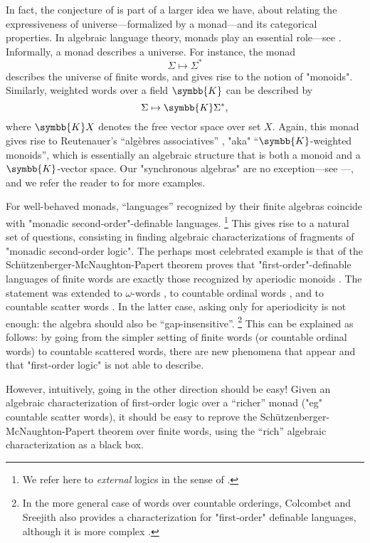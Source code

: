 In fact, the conjecture of 
is part of a larger idea we have, about relating the expressiveness of
universe---formalized by a monad---and its categorical properties. 
In algebraic language theory, monads play an essential role---see .
Informally, a monad describes a universe.
For instance, the monad
\[
	\Sigma \mapsto \Sigma^*
\]
describes the universe of finite words, and gives rise to the notion of
"monoids". Similarly, weighted words over a field $\symbb{K}$ can be described by
\[
	\Sigma \mapsto \symbb{K}\Sigma^*,
\]
where $\symbb{K}X$ denotes the free vector space over set $X$.
Again, this monad gives rise to Reutenauer's ``algèbres associatives''
\cite{Reutenauer1980SeriesFormelles}, "aka" ``$\symbb{K}$-weighted monoids'',
which is essentially an algebraic structure that is both a monoid and a
$\symbb{K}$-vector space.
Our "synchronous algebras" are no exception---see ---,
and we refer the reader to \cite[\S~4]{Bojanczyk2020MSO} for more examples.

For well-behaved monads, ``languages'' recognized by their finite algebras
coincide with "monadic second-order"-definable languages.%
\footnote{We refer here to \emph{external} logics in the sense of
.}
This gives rise to a natural set of questions, consisting
in finding algebraic characterizations
of fragments of "monadic second-order logic".
The perhaps most celebrated example is that of
the Schützenberger-McNaughton-Papert theorem
proves that "first-order"-definable languages of finite words
are exactly those recognized by aperiodic monoids
\cite{Schutzenberger1965FiniteMonoidsAperiodic,McNaughtonPapert1971CounterFreeAutomata}.
The statement was extended to $\omega$-words \cite{Perrin1984Recent},
to countable ordinal words \cite{Bedon2001Logic},
and to countable scatter words \cite{BesCarton2011AlgebraicFO}.
In the latter case, asking only for aperiodicity is not enough:
the algebra should also be ``gap-insensitive''.%
\footnote{In the more general case of words over countable orderings,
Colcombet and Sreejith also provides a characterization for "first-order"
definable languages, although it is more complex \cite{ColcombetSreejith2015Limited}.}
This can be explained as follows: by going from the simpler setting
of finite words (or countable ordinal words) to countable scattered words,
there are new phenomena that appear and that "first-order logic" is 
not able to describe.

However, intuitively, going in the other direction should be easy!
Given an algebraic characterization of first-order logic over a ``richer'' monad
("eg" countable scatter words), it should be easy to reprove the
Schützenberger-McNaughton-Papert theorem over finite words, using the
``rich'' algebraic characterization as a black box.

